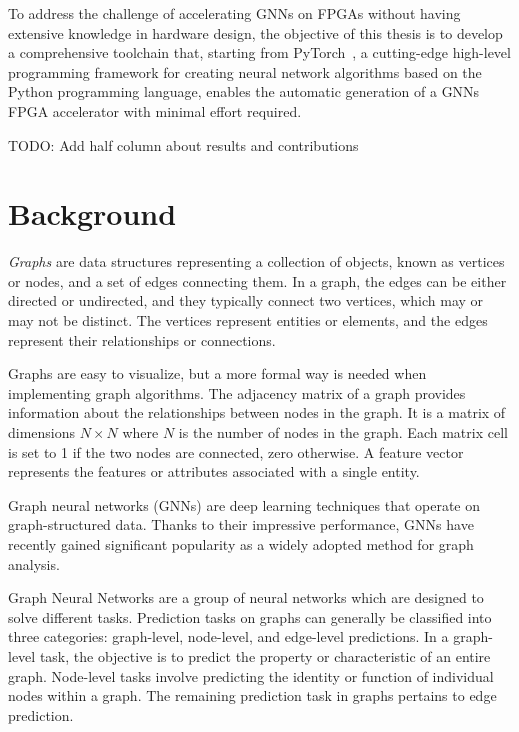 \documentclass[11pt,a4paper,twocolumn]{article}
\begin{document}
To address the challenge of accelerating GNNs on FPGAs without having extensive knowledge in hardware design, the objective of this thesis is to develop a comprehensive toolchain that, starting from PyTorch~\cite{DBLP:journals/corr/abs-1912-01703},
a cutting-edge high-level programming framework for creating neural network algorithms based on the Python programming language, enables the
automatic generation of a GNNs FPGA accelerator with minimal effort required.

TODO: Add half column about results and contributions


\section{Background}
\label{sec:background}%

\textit{Graphs} are data structures representing a collection of objects, known as vertices or nodes, and a set of edges connecting them.
In a graph, the edges can be either directed or undirected, and they typically connect two vertices, which may or may not be distinct.
The vertices represent entities or elements, and the edges represent their relationships or connections.

Graphs are easy to visualize, but a more formal way is needed when implementing graph algorithms.
The adjacency matrix of a graph provides information about the relationships between nodes in the graph.
It is a matrix of dimensions $N \times N$ where $N$ is the number of nodes in the graph. Each matrix cell is set to 1 if the two nodes are connected, zero otherwise.
A feature vector represents the features or attributes associated with a single entity.

Graph neural networks (GNNs) are deep learning techniques that operate on graph-structured data.
Thanks to their impressive performance, GNNs have recently gained significant popularity as a widely adopted method for graph analysis.

Graph Neural Networks are a group of neural networks which are designed to solve different tasks.
Prediction tasks on graphs can generally be classified into three categories: graph-level, node-level, and edge-level predictions.
In a graph-level task, the objective is to predict the property or characteristic of an entire graph.
Node-level tasks involve predicting the identity or function of individual nodes within a graph.
The remaining prediction task in graphs pertains to edge prediction.
\end{document}
